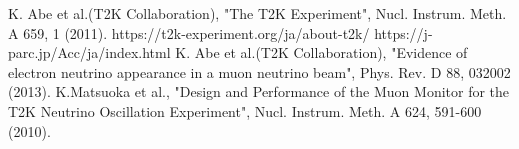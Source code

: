 \begin{thebibliography}{99}
 K. Abe et al.(T2K Collaboration), "The T2K Experiment", Nucl. Instrum. Meth. A 659, 1 (2011).
 https://t2k-experiment.org/ja/about-t2k/
 https://j-parc.jp/Acc/ja/index.html
 K. Abe et al.(T2K Collaboration), "Evidence of electron neutrino appearance in a muon neutrino
beam", Phys. Rev. D 88, 032002 (2013).
 K.Matsuoka et al., "Design and Performance of the Muon Monitor for the T2K Neutrino Oscillation Experiment", Nucl. Instrum. Meth. A 624, 591-600 (2010).

\end{thebibliography}
